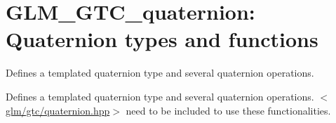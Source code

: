 \hypertarget{group__gtc__quaternion}{\section{\-G\-L\-M\-\_\-\-G\-T\-C\-\_\-quaternion\-: \-Quaternion types and functions}
\label{group__gtc__quaternion}
}


\-Defines a templated quaternion type and several quaternion operations.  


\-Defines a templated quaternion type and several quaternion operations. $<$\hyperlink{gtc_2quaternion_8hpp}{glm/gtc/quaternion.\-hpp}$>$ need to be included to use these functionalities. 